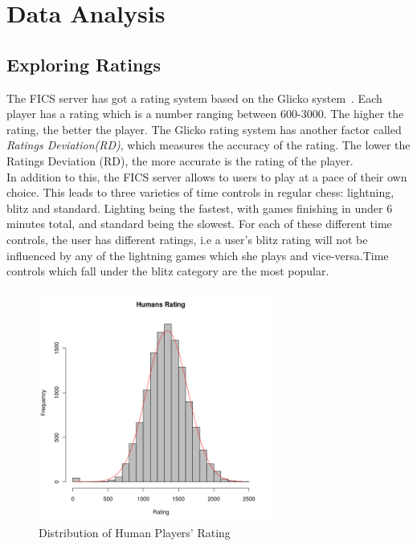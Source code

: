\documentclass{article}
\begin{document}
\section{Data Analysis}

\subsection{Exploring Ratings}
The FICS server has got a rating system based on the Glicko system~\cite{spec:glicko}. Each player has a rating which is a number ranging between 600-3000. The higher the rating, the better the player. The Glicko rating system has another factor called \textsl{Ratings Deviation(RD)}, which measures the accuracy of the rating. The lower the Ratings Deviation (RD), the more accurate is the rating of the player.\\

In addition to this, the FICS server allows to users to play at a pace of their own choice. This leads to three varieties of time controls in regular chess: lightning, blitz and standard. Lighting being the fastest, with games finishing in under 6 minutes total, and standard being the slowest. For each of these different time controls, the user has different ratings, i.e a user's blitz rating will not be influenced by any of the lightning games which she plays and vice-versa.Time controls which fall under the blitz category are the most popular.\\

\begin{figure} [htp]
\begin{center}
\includegraphics[width=3in]{humans_rating.png}
\end{center}
\caption{Distribution of Human Players' Rating}
\label{fig:humanrating}
\end{figure}
\end{document}
